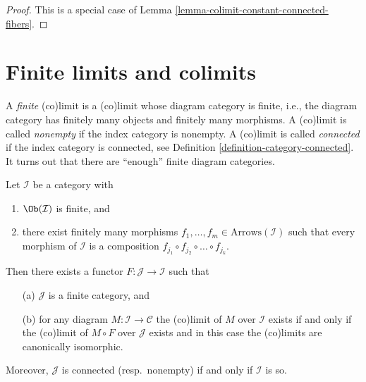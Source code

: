 \begin{proof}
This is a special case of Lemma \ref{lemma-colimit-constant-connected-fibers}.
\end{proof}






\section{Finite limits and colimits}
\label{section-finite-limits}

\noindent
A {\it finite} (co)limit is a (co)limit whose diagram category is finite,
i.e., the diagram category has finitely many objects and finitely many
morphisms. A (co)limit is called {\it nonempty} if the index category is
nonempty. A (co)limit is called {\it connected} if the index category is
connected, see
Definition \ref{definition-category-connected}.
It turns out that there are ``enough'' finite diagram categories.

\begin{lemma}
\label{lemma-finite-diagram-category}
Let $\mathcal{I}$ be a category with
\begin{enumerate}
\item $\Ob(\mathcal{I})$ is finite, and
\item there exist finitely many morphisms
$f_1, \ldots, f_m \in \text{Arrows}(\mathcal{I})$ such
that every morphism of $\mathcal{I}$ is a composition
$f_{j_1} \circ f_{j_2} \circ \ldots \circ f_{j_k}$.
\end{enumerate}
Then there exists a functor $F : \mathcal{J} \to \mathcal{I}$
such that
\begin{enumerate}
\item[(a)] $\mathcal{J}$ is a finite category, and
\item[(b)] for any diagram $M : \mathcal{I} \to \mathcal{C}$ the
(co)limit of $M$ over $\mathcal{I}$ exists if and only if
the (co)limit of $M \circ F$ over $\mathcal{J}$ exists and in this case
the (co)limits are canonically isomorphic.
\end{enumerate}
Moreover, $\mathcal{J}$ is connected (resp.\ nonempty) if and only if
$\mathcal{I}$ is so.
\end{lemma}

